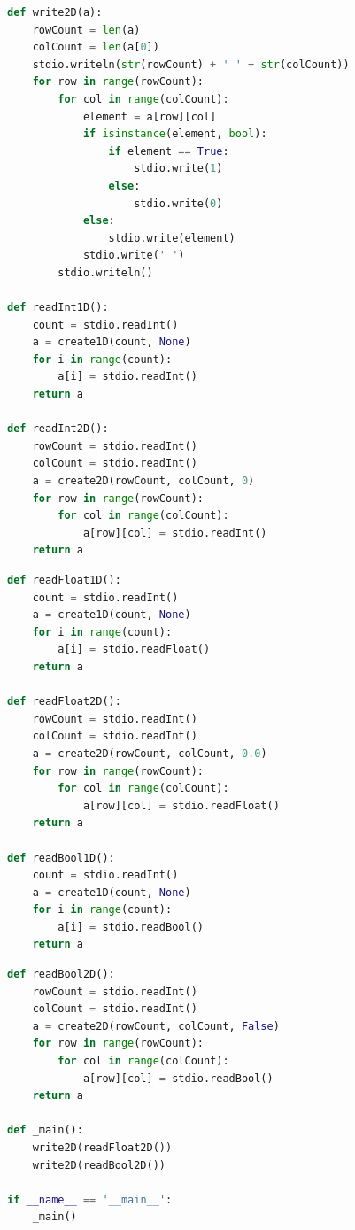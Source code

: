 \documentclass[8pt,a4paper,compress]{beamer}
\begin{document}
\begin{frame}[fragile]
\pause

\begin{lstlisting}[language=Python,style=focusin]
def write2D(a):
    rowCount = len(a)
    colCount = len(a[0])
    stdio.writeln(str(rowCount) + ' ' + str(colCount))
    for row in range(rowCount):
        for col in range(colCount):
            element = a[row][col]
            if isinstance(element, bool):
                if element == True:
                    stdio.write(1)
                else:
                    stdio.write(0)
            else:
                stdio.write(element)
            stdio.write(' ')
        stdio.writeln()

def readInt1D():
    count = stdio.readInt()
    a = create1D(count, None)
    for i in range(count):
        a[i] = stdio.readInt()
    return a

def readInt2D():
    rowCount = stdio.readInt()
    colCount = stdio.readInt()
    a = create2D(rowCount, colCount, 0)
    for row in range(rowCount):
        for col in range(colCount):
            a[row][col] = stdio.readInt()
    return a
\end{lstlisting}
\end{frame}

\begin{frame}[fragile]
\pause

\begin{lstlisting}[language=Python,style=focusin]
def readFloat1D():
    count = stdio.readInt()
    a = create1D(count, None)
    for i in range(count):
        a[i] = stdio.readFloat()
    return a

def readFloat2D():
    rowCount = stdio.readInt()
    colCount = stdio.readInt()
    a = create2D(rowCount, colCount, 0.0)
    for row in range(rowCount):
        for col in range(colCount):
            a[row][col] = stdio.readFloat()
    return a

def readBool1D():
    count = stdio.readInt()
    a = create1D(count, None)
    for i in range(count):
        a[i] = stdio.readBool()
    return a
\end{lstlisting}
\end{frame}


\begin{frame}[fragile]
\pause

\begin{lstlisting}[language=Python,style=focusin]
def readBool2D():
    rowCount = stdio.readInt()
    colCount = stdio.readInt()
    a = create2D(rowCount, colCount, False)
    for row in range(rowCount):
        for col in range(colCount):
            a[row][col] = stdio.readBool()
    return a

def _main():
    write2D(readFloat2D())
    write2D(readBool2D())

if __name__ == '__main__':
    _main()
\end{lstlisting}
\end{frame}
\end{document}
